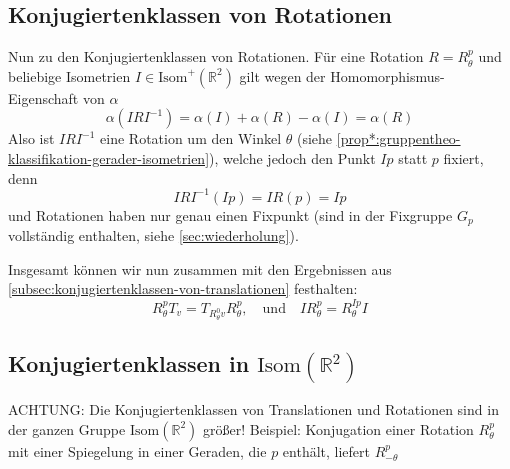 \documentclass[a4paper, ngerman]{article}
\numberwithin{equation}{chapter}
\theoremstyle{plain}
\theoremstyle{definition}
\newcommand{\geradisometr}{\ensuremath{\mathrm{Isom}^+(\mathbb R^2)}}
\newcommand{\anm}[1]{{\color{red} #1}}
\begin{document}
\subsection{Konjugiertenklassen von Rotationen}\label{subsec:konjugiertenklassen-von-rotationen}
Nun zu den Konjugiertenklassen von Rotationen. Für eine Rotation \(R = R_\theta^p\) und beliebige Isometrien \(I \in \geradisometr\) gilt wegen der Homomorphismus-Eigenschaft von \(\alpha\) 
\begin{equation*}
    \alpha(IRI^{-1}) = \alpha(I) + \alpha(R) - \alpha(I) = \alpha(R)
\end{equation*}
Also ist \(IRI^{-1}\) eine Rotation um den Winkel \(\theta\) (siehe \cref{prop*:gruppentheo-klassifikation-gerader-isometrien}), welche jedoch den Punkt \(Ip\) statt \(p\) fixiert, denn
\begin{equation*}
    IRI^{-1}(Ip) = IR(p) = Ip
\end{equation*}
und Rotationen haben nur genau einen Fixpunkt (sind in der Fixgruppe \(G_p\) vollständig enthalten, siehe \cref{sec:wiederholung}). 

Insgesamt können wir nun zusammen mit den Ergebnissen aus \cref{subsec:konjugiertenklassen-von-translationen} festhalten:
\begin{equation}\label{eq:konjugations-relationen}
    R_\theta^p T_v = T_{R_\theta^0 v} R_\theta^p, \quad \text{und} \quad IR_\theta^p = R_\theta^{Ip}I
\end{equation}

\subsection{Konjugiertenklassen in \(\mathrm{Isom}(\mathbb R^2)\)}
ACHTUNG: Die Konjugiertenklassen von Translationen und Rotationen sind in der ganzen Gruppe \(\mathrm{Isom}(\mathbb R^2)\) größer! \anm{Beispiel: Konjugation einer Rotation \(R_\theta^p\) mit einer Spiegelung in einer Geraden, die \(p\) enthält, liefert \(R_{-\theta}^p\)}
\end{document}

